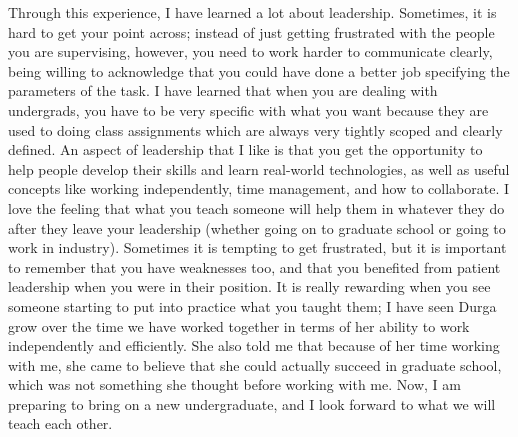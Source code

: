 \documentclass{article}
\begin{document}
Through this experience, I have learned a lot about leadership.
Sometimes, it is hard to get your point across; instead of just getting frustrated with the people you are supervising, however, you need to work harder to communicate clearly, being willing to acknowledge that you could have done a better job specifying the parameters of the task.
I have learned that when you are dealing with undergrads, you have to be very specific with what you want because they are used to doing class assignments which are always very tightly scoped and clearly defined.
An aspect of leadership that I like is that you get the opportunity to help people develop their skills and learn real-world technologies, as well as useful concepts like working independently, time management, and how to collaborate.
I love the feeling that what you teach someone will help them in whatever they do after they leave your leadership (whether going on to graduate school or going to work in industry).
Sometimes it is tempting to get frustrated, but it is important to remember that you have weaknesses too, and that you benefited from patient leadership when you were in their position.
It is really rewarding when you see someone starting to put into practice what you taught them; I have seen Durga grow over the time we have worked together in terms of her ability to work independently and efficiently.
She also told me that because of her time working with me, she came to believe that she could actually succeed in graduate school, which was not something she thought before working with me.
Now, I am preparing to bring on a new undergraduate, and I look forward to what we will teach each other.
\end{document}
